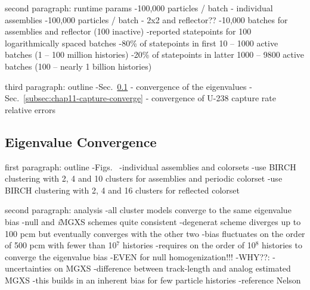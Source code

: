 second paragraph: runtime params
-100,000 particles / batch - individual assemblies
-100,000 particles / batch - 2x2 and reflector??
-10,000 batches for assemblies and reflector (100 inactive)
-reported statepoints for 100 logarithmically spaced batches
  -80\% of statepoints in first 10 -- 1000 active batches (1 -- 100 million histories)
  -20\% of statepoints in latter 1000 -- 9800 active batches (100 -- nearly 1 billion histories)

third paragraph: outline
-Sec.~\ref{subsec:chap11-eigenvalue-converge} - convergence of the eigenvalues
-Sec.~\ref{subsec:chap11-capture-converge} - convergence of U-238 capture rate relative errors

\subsection{Eigenvalue Convergence}
\label{subsec:chap11-eigenvalue-converge}

first paragraph: outline
-Figs.~
  -individual assemblies and colorsets
-use BIRCH clustering with 2, 4 and 10 clusters for assemblies and periodic colorset
-use BIRCH clustering with 2, 4 and 16 clusters for reflected colorset

second paragraph: analysis
-all cluster models converge to the same eigenvalue bias
  -null and \textit{i}\ac{MGXS} schemes quite consistent
  -degenerat scheme diverges up to 100 \ac{pcm} but eventually converges with the other two
-bias fluctuates on the order of 500 \ac{pcm} with fewer than 10$^{7}$ histories
-requires on the order of 10$^{8}$ histories to converge the eigenvalue bias
  -EVEN for null homogenization!!!
-WHY??:
  -uncertainties on MGXS
  -difference between track-length and analog estimated MGXS
    -this builds in an inherent bias for few particle histories
    -reference Nelson~\cite{nelson2014improved}

